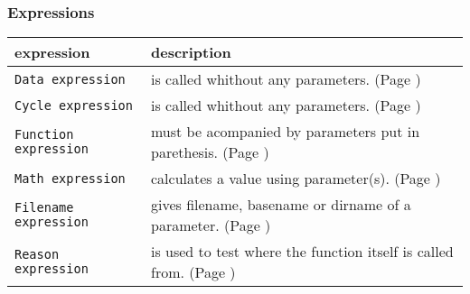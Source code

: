 \newpage
\subsubsection{Expressions}
\label{fuexpressions}


\begin{tabularx}{\textwidth}{l|X}
expression                   & description\\
\hline
{\verb+Data expression+}    & is called whithout any parameters. (Page \pageref{fuexpressionsdata})\\
{\verb+Cycle expression+}   & is called whithout any parameters. (Page \pageref{fuexpressionscycle})\\
{\verb+Function expression+}& must be acompanied by parameters put in parethesis. (Page \pageref{fuexpressionsfunctions})\\
{\verb+Math expression+}    & calculates a value using parameter(s). (Page \pageref{fuexpressionsmath})\\
{\verb+Filename expression+}& gives filename, basename or dirname of a parameter. (Page \pageref{fuexpressionsfilename})\\
{\verb+Reason expression+}  & is used to test where the function itself is called from. (Page \pageref{fuexpressionsreason})\\
\end{tabularx}


\label{fuexpressionsdata}


